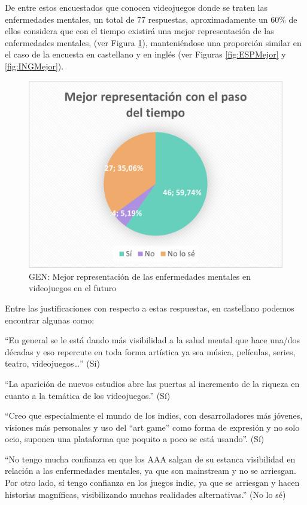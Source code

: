 \documentclass[12pt, a4paper,twoside,titlepage]{book}
\begin{document}
De entre estos encuestados que conocen videojuegos donde se traten las enfermedades mentales, un total de 77 respuestas, aproximadamente un 60\% de ellos considera que con el tiempo existirá una mejor representación de las enfermedades mentales, (ver Figura \ref{fig:Mejor}), manteniéndose una proporción similar en el caso de la encuesta en castellano y en inglés (ver Figuras \ref{fig:ESPMejor} y \ref{fig:INGMejor}). 

\begin{figure}
\centering
 \includegraphics[width=.8\linewidth]{Imagenes Form GEN/12GENMejor}
 \caption{GEN: Mejor representación de las enfermedades mentales en videojuegos en el futuro}
 \label{fig:Mejor}
 \end{figure}

Entre las justificaciones con respecto a estas respuestas, en castellano podemos encontrar algunas como: 

``En general se le está dando más visibilidad a la salud mental que hace una/dos décadas y eso repercute en toda forma artística ya sea música, películas, series, teatro, videojuegos…'' (Sí)

``La aparición de nuevos estudios abre las puertas al incremento de la riqueza en cuanto a la temática de los videojuegos.'' (Sí)

``Creo que especialmente el mundo de los indies, con desarrolladores más jóvenes, visiones más personales y uso del ``art game'' como forma de expresión y no solo ocio, suponen una plataforma que poquito a poco se está usando''. (Sí)

``No tengo mucha confianza en que los AAA salgan de su estanca visibilidad en relación a las enfermedades mentales, ya que son mainstream y no se arriesgan. Por otro lado, sí tengo confianza en los juegos indie, ya que se arriesgan y hacen historias magníficas, visibilizando muchas realidades alternativas.'' (No lo sé) 
\end{document}
